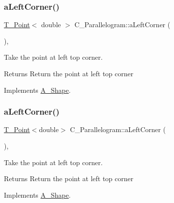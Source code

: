 \subsubsection{\texorpdfstring{a\+Left\+Corner()}{aLeftCorner()}\hspace{0.1cm}{\footnotesize\ttfamily [1/2]}}
{\footnotesize\ttfamily \hyperlink{classT__Point}{T\+\_\+\+Point}$<$ double $>$ C\+\_\+\+Parallelogram\+::a\+Left\+Corner (\begin{DoxyParamCaption}{ }\end{DoxyParamCaption})\hspace{0.3cm}{\ttfamily [override]}, {\ttfamily [virtual]}}



Take the point at left top corner. 

\begin{DoxyReturn}{Returns}
Return the point at left top corner 
\end{DoxyReturn}


Implements \hyperlink{classA__Shape_abe6781b13037bf7ecea8ff9456b31533}{A\+\_\+\+Shape}.

\mbox{\label{classC__Parallelogram_aba287e395a90cc8038388fc85dbeb6d8}} 
\subsubsection{\texorpdfstring{a\+Left\+Corner()}{aLeftCorner()}\hspace{0.1cm}{\footnotesize\ttfamily [2/2]}}
{\footnotesize\ttfamily \hyperlink{classT__Point}{T\+\_\+\+Point}$<$double$>$ C\+\_\+\+Parallelogram\+::a\+Left\+Corner (\begin{DoxyParamCaption}{ }\end{DoxyParamCaption})\hspace{0.3cm}{\ttfamily [override]}, {\ttfamily [virtual]}}



Take the point at left top corner. 

\begin{DoxyReturn}{Returns}
Return the point at left top corner 
\end{DoxyReturn}


Implements \hyperlink{classA__Shape_abe6781b13037bf7ecea8ff9456b31533}{A\+\_\+\+Shape}.

